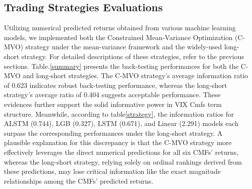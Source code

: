 \documentclass[10pt,letterpaper]{article}
\begin{document}
\subsection*{Trading Strategies Evaluations}
Utilizing numerical predicted returns obtained from various machine learning models, we implemented both the Constrained Mean-Variance Optimization (C-MVO) strategy under the mean-variance framework and the widely-used long-short strategy. For detailed descriptions of these strategies, refer to the previous sections. Table.\ref{summary} presents the back-testing performances  for both the C-MVO and long-short strategies. The C-MVO strategy's average information ratio of 0.623 indicates robust back-testing performance, whereas the long-short strategy's average ratio of 0.404 suggests acceptable performance. These evidences further support the solid informative power in VIX Cmfs term structure. Meanwhile, according to table\ref{strategy}, the information ratios for ALSTM (0.744), LGB (0.327), LSTM (0.671), and Linear (2.291) models each surpass the corresponding performances under the long-short strategy. A plausible explanation for this discrepancy is that the C-MVO strategy more effectively leverages the direct numerical predictions for all six CMFs' returns, whereas the long-short strategy, relying solely on ordinal rankings derived from these predictions, may lose critical information like the exact magnitude relationships among the CMFs' predicted returns.
\end{document}
